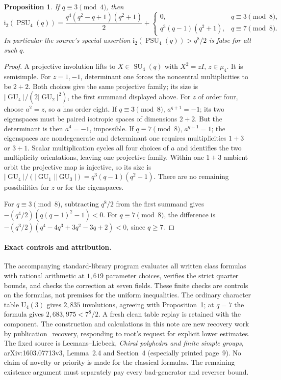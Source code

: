 \documentclass[10pt]{article}
\newtheorem{proposition}[theorem]{Proposition}
\newcommand{\GU}{\operatorname{GU}}
\newcommand{\PSU}{\operatorname{PSU}}
\newcommand{\ii}{\mathrm i_2}
\begin{document}
\begin{proposition}\label{u4}
If $q\equiv3\pmod4$, then
\[
\ii(\PSU_4(q))=
\frac{q^4(q^2-q+1)(q^2+1)}2+
\begin{cases}0,&q\equiv3\pmod8,\\q^3(q-1)(q^2+1),&q\equiv7\pmod8.
\end{cases}
\]
In particular the source's special assertion $\ii(\PSU_4(q))>q^8/2$
is false for all such $q$.
\end{proposition}
\begin{proof}
A projective involution lifts to $X\in\operatorname{SU}_4(q)$ with
$X^2=zI$, $z\in\mu_4$. It is semisimple. For $z=1,-1$, determinant one
forces the noncentral multiplicities to be $2+2$. Both choices give the
same projective family; its size is
$|\GU_4|/(2|\GU_2|^2)$, the first summand displayed above.
For $z$ of order four, choose $a^2=z$, so $a$ has order eight. If
$q\equiv3\pmod8$, $a^{q+1}=-1$; its two eigenspaces must be paired
isotropic spaces of dimensions $2+2$. But the determinant is then
$a^4=-1$, impossible. If $q\equiv7\pmod8$, $a^{q+1}=1$; the eigenspaces
are nondegenerate and determinant one requires multiplicities $1+3$ or
$3+1$. Scalar multiplication cycles all four choices of $a$ and identifies
the two multiplicity orientations, leaving one projective family. Within
one $1+3$ ambient orbit the projective map is injective, so its size is
$|\GU_4|/(|\GU_1||\GU_3|)=q^3(q-1)(q^2+1)$.
There are no remaining possibilities for $z$ or for the eigenspaces.

For $q\equiv3\pmod8$, subtracting $q^8/2$ from the first summand gives
$-(q^4/2)(q(q-1)^2-1)<0$. For $q\equiv7\pmod8$, the difference is
$-(q^3/2)(q^4-4q^3+3q^2-3q+2)<0$, since $q\ge7$.
\end{proof}

\paragraph{Exact controls and attribution.}
The accompanying standard-library program evaluates all written class
formulas with rational arithmetic at $1,619$ parameter choices, verifies
the strict quarter bounds, and checks the correction at seven fields.
These finite checks are controls on the formulas, not premises for the
uniform inequalities. The ordinary character table $\mathrm U_4(3)$ gives
$2,835$ involutions, agreeing with Proposition~\ref{u4}; at $q=7$ the
formula gives $2,683,975<7^8/2$. A fresh clean table replay is retained with the component. The construction and calculations in this note
are new recovery work by publication\_recovery, responding to root's
request for explicit lower estimates. The fixed source is Leemans--Liebeck,
\emph{Chiral polyhedra and finite simple groups}, arXiv:1603.07713v3,
Lemma~2.4 and Section~4 (especially printed page~9). No claim of novelty or
priority is made for the classical formulas. The remaining existence
argument must separately pay every bad-generator and reverser bound.
\end{document}
